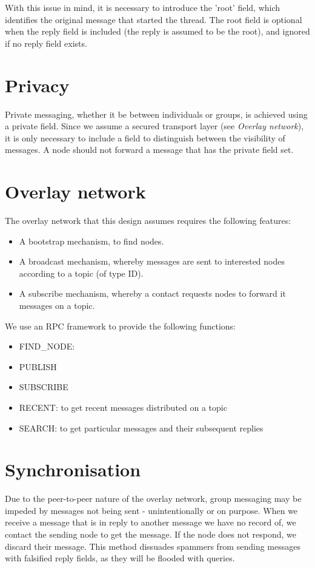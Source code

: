 \documentclass[10pt,a4paper,onecolumn]{article}
\begin{document}
With this issue in mind, it is necessary to introduce the 'root' field, which identifies the original message that started the thread. The root field is  optional when the reply field is included (the reply is assumed to be the root), and ignored if no reply field exists.


\section{Privacy}
Private messaging, whether it be between individuals or groups, is achieved using a private field. Since we assume a secured transport layer (see \textit{Overlay network}), it is only necessary to include a field to distinguish between the visibility of messages. A node should not forward a message that has the private field set. 


\section{Overlay network}
The overlay network that this design assumes requires the following features:
\begin{itemize}
\item A bootstrap mechanism, to find nodes.
\item A broadcast mechanism, whereby messages are sent to interested nodes according to a topic (of type ID).
\item A subscribe mechanism, whereby a contact requests nodes to forward it messages on a topic.
\end{itemize}

We use an RPC framework to provide the following functions:
\begin{itemize}
\item FIND\_NODE: 
\item PUBLISH
\item SUBSCRIBE
\item RECENT: to get recent messages distributed on a topic
\item SEARCH: to get particular messages and their subsequent replies
\end{itemize}


\section{Synchronisation}
Due to the peer-to-peer nature of the overlay network, group messaging may be impeded by messages not being sent - unintentionally or on purpose. When we receive a message that is in reply to another message we have no record of, we contact the sending node to get the message. If the node does not respond, we discard their message. This method dissuades spammers from sending messages with falsified reply fields, as they will be flooded with queries. 
\end{document}
